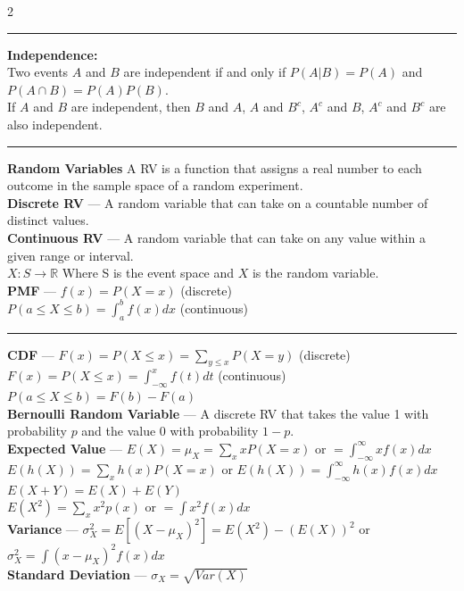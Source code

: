 \documentclass[10pt,letterpaper]{article}
\begin{document}
\begin{multicols}{2}
\vspace{0.1cm}
\hrule
\vspace{0.1cm}

\textbf{Independence:}\\
Two events \( A \) and \( B \) are independent if and only if $P(A|B) = P(A)$ and \( P(A \cap B) = P(A)P(B) \).\\
If $A$ and $B$ are independent, then $B$ and $A$, $A$ and $B^c$, $A^c$ and $B$, $A^c$ and $B^c$ are also independent.

\vspace{0.1cm}
\hrule
\vspace{0.1cm}

\textbf{Random Variables}
A RV is a function that assigns a real number to each outcome in the sample space of a random experiment.\\
\textbf{Discrete RV} --- A random variable that can take on a countable number of distinct values.\\
\textbf{Continuous RV} --- A random variable that can take on any value within a given range or interval.\\
$X: S \rightarrow \mathbb{R}$ Where S is the event space and \( X \) is the random variable.\\
\textbf{PMF} --- $f(x) = P(X = x)$ (discrete)\\
$P(a \leq X \leq b) = \int_{a}^{b} f(x)dx$ (continuous)

\vspace{0.1cm}
\hrule
\vspace{0.1cm}

\textbf{CDF} --- $F(x) = P(X \leq x) = \sum_{y \leq x} P(X = y)$ (discrete)\\
$F(x) = P(X \leq x) = \int_{-\infty}^{x} f(t)dt$ (continuous)\\
$P(a \leq X \leq b) = F(b) - F(a)$\\
\textbf{Bernoulli Random Variable} --- A discrete RV that takes the value 1 with probability \( p \) and the value 0 with probability \( 1-p \).\\
\textbf{Expected Value} --- $E(X) = \mu_X = \sum_x xP(X=x)$ or $= \int_{-\infty}^{\infty} xf(x)dx$\\
$E(h(X)) = \sum_x h(x)P(X=x)$ or $E(h(X)) = \int_{-\infty}^{\infty} h(x)f(x)dx$\\
$E(X + Y) = E(X) + E(Y)$\\
$E(X^2) = \sum_x x^2p(x)$ or $= \int x^2f(x)dx$\\
\textbf{Variance} --- $\sigma_X^2 = E[(X - \mu_X)^2] = E(X^2) - (E(X))^2$ or $\sigma_X^2 = \int (x - \mu_X)^2 f(x) dx$\\
\textbf{Standard Deviation} --- $\sigma_X = \sqrt{Var(X)}$


\end{multicols}
\end{document}
